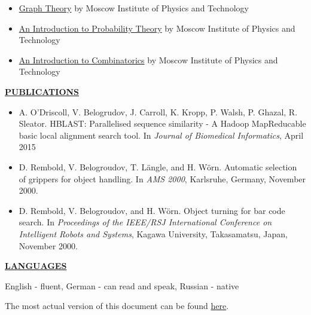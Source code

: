 \documentclass[a4paper,12pt,]{article}
\begin{document}
\begin{itemize}
\begin{itemize}
    \item \href{https://www.coursera.org/account/accomplishments/records/99S5T7XD8RZ9}{Graph Theory} by Moscow Institute of Physics and Technology

    \item \href{https://www.coursera.org/account/accomplishments/records/6UP8ZRCWU5NE}{An Introduction to Probability Theory} by Moscow Institute of Physics and Technology

    \item \href{https://www.coursera.org/account/accomplishments/records/4KVSMUWZNQ85}{An Introduction to Combinatorics} by Moscow Institute of Physics and Technology

    \end{itemize}

  \end{itemize}

  \vspace{1ex}

  \uline{ \bfseries{PUBLICATIONS} }

  \begin{itemize}
    \item A. O'Driscoll, V. Belogrudov, J. Carroll, K. Kropp, P. Walsh, P. Ghazal, R. Sleator.
      HBLAST: Parallelised sequence similarity - A Hadoop MapReducable basic local alignment search tool. In \textsl{Journal of Biomedical Informatics}, April 2015

    \item D. Rembold, V. Belogroudov, T. L\"{a}ngle, and H. W\"{o}rn. 
      Automatic selection of grippers for object handling. In \textsl{AMS 2000}, 
      Karlsruhe, Germany, November 2000.
      
    \item D. Rembold, V. Belogroudov, and H. W\"{o}rn. Object turning for bar code
      search. In \textsl{Proceedings of the IEEE/RSJ International Conference on
      Intelligent Robots and Systems}, Kagawa University, Takasamatsu, Japan,
      November 2000.

  \end{itemize}

  \vspace{1ex}

  \uline{ \bfseries {LANGUAGES} }

  \vspace{2ex}
  English - fluent, German - can read and speak, Russian - native
  
  \vspace{3ex}
  The most actual version of this document can be found \href{https://github.com/vlad-belogrudov/resume/blob/master/resume.pdf}{here}.
\end{document}
